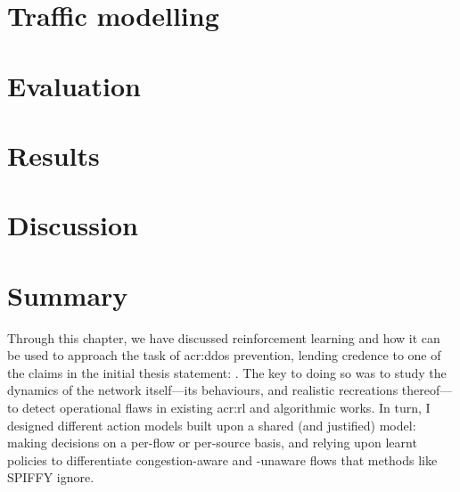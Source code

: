 \section{Traffic modelling}\label{sec:a-new-normal}


\section{Evaluation}\label{sec:ddos-evaluation}


\section{Results}\label{sec:the-results-of-doing-so}


\section{Discussion}\label{sec:ddos-discussion}


%

\section{Summary}\label{sec:ddos-summary}
Through this chapter, we have discussed reinforcement learning and how it can be used to approach the task of \gls{acr:ddos} prevention, lending credence to one of the claims in the initial thesis statement: .
The key to doing so was to study the dynamics of the network itself---its behaviours, and realistic recreations thereof---to detect operational flaws in existing \gls{acr:rl} and algorithmic works.
In turn, I designed different action models built upon a shared (and justified) model: making decisions on a per-flow or per-source basis, and relying upon learnt policies to differentiate congestion-aware and -unaware flows that methods like SPIFFY ignore.

